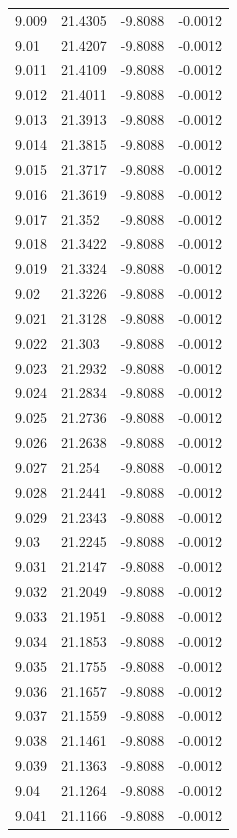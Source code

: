 \begin{tabular}{llll}
9.009 & 21.4305 & -9.8088 & -0.0012 \\
9.01 & 21.4207 & -9.8088 & -0.0012 \\
9.011 & 21.4109 & -9.8088 & -0.0012 \\
9.012 & 21.4011 & -9.8088 & -0.0012 \\
9.013 & 21.3913 & -9.8088 & -0.0012 \\
9.014 & 21.3815 & -9.8088 & -0.0012 \\
9.015 & 21.3717 & -9.8088 & -0.0012 \\
9.016 & 21.3619 & -9.8088 & -0.0012 \\
9.017 & 21.352 & -9.8088 & -0.0012 \\
9.018 & 21.3422 & -9.8088 & -0.0012 \\
9.019 & 21.3324 & -9.8088 & -0.0012 \\
9.02 & 21.3226 & -9.8088 & -0.0012 \\
9.021 & 21.3128 & -9.8088 & -0.0012 \\
9.022 & 21.303 & -9.8088 & -0.0012 \\
9.023 & 21.2932 & -9.8088 & -0.0012 \\
9.024 & 21.2834 & -9.8088 & -0.0012 \\
9.025 & 21.2736 & -9.8088 & -0.0012 \\
9.026 & 21.2638 & -9.8088 & -0.0012 \\
9.027 & 21.254 & -9.8088 & -0.0012 \\
9.028 & 21.2441 & -9.8088 & -0.0012 \\
9.029 & 21.2343 & -9.8088 & -0.0012 \\
9.03 & 21.2245 & -9.8088 & -0.0012 \\
9.031 & 21.2147 & -9.8088 & -0.0012 \\
9.032 & 21.2049 & -9.8088 & -0.0012 \\
9.033 & 21.1951 & -9.8088 & -0.0012 \\
9.034 & 21.1853 & -9.8088 & -0.0012 \\
9.035 & 21.1755 & -9.8088 & -0.0012 \\
9.036 & 21.1657 & -9.8088 & -0.0012 \\
9.037 & 21.1559 & -9.8088 & -0.0012 \\
9.038 & 21.1461 & -9.8088 & -0.0012 \\
9.039 & 21.1363 & -9.8088 & -0.0012 \\
9.04 & 21.1264 & -9.8088 & -0.0012 \\
9.041 & 21.1166 & -9.8088 & -0.0012 \\

\end{tabular}
